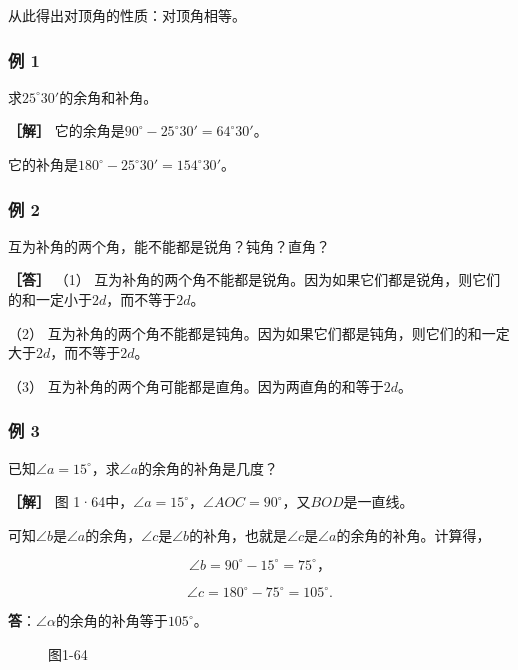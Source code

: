 从此得出对顶角的性质：对顶角相等。

\subsubsection{例 1}

求\(25^{\circ}30'\)的余角和补角。

\textbf{［解］}
它的余角是\(90^{\circ} - 25^{\circ}30' = 64^{\circ}30'\)。

它的补角是\(180^{\circ} - 25^{\circ}30' = 154^{\circ}30'\)。

\subsubsection{例 2}

互为补角的两个角，能不能都是锐角？钝角？直角？

\textbf{［答］} （1）
互为补角的两个角不能都是锐角。因为如果它们都是锐角，则它们的和一定小于\(2d\)，而不等于\(2d\)。

（2）
互为补角的两个角不能都是钝角。因为如果它们都是钝角，则它们的和一定大于\(2d\)，而不等于\(2d\)。

（3） 互为补角的两个角可能都是直角。因为两直角的和等于\(2d\)。

\subsubsection{例 3}

已知\(\angle a=15^{\circ}\)，求\(\angle a\)的余角的补角是几度？

\textbf{［解］} 图
1·64中，\(\angle a = 15^{\circ}\)，\(\angle AOC = 90^{\circ}\)，又\(BOD\)是一直线。

可知\(\angle b\)是\(\angle a\)的余角，\(\angle c\)是\(\angle b\)的补角，也就是\(\angle c\)是\(\angle a\)的余角的补角。计算得，

\[
\angle b = 90 ^{\circ} - 15 ^{\circ} = 75 ^{\circ}\text{，}
\]

\[
\angle c = 180 ^{\circ} - 75 ^{\circ} = 105 ^{\circ}.
\]

\textbf{答}：\(\angle \alpha\)的余角的补角等于\(105^{\circ}\)。

\begin{figure}
\centering
{}
\caption{图1-64}
\end{figure}

